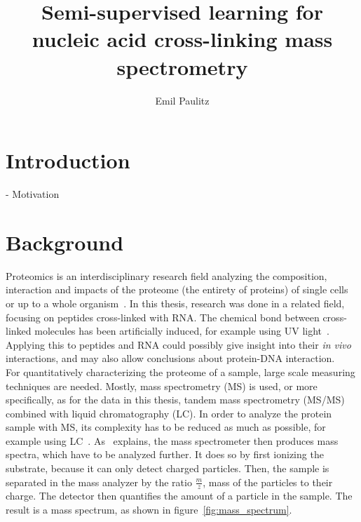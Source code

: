 \documentclass[10pt,a4paper]{article}
\author{Emil Paulitz}
\title{Semi-supervised learning for nucleic acid cross-linking mass spectrometry}
\begin{document}
	\ohead{\theauthor}
	\cfoot{\pagemark}
	\maketitle
	\tableofcontents
	
	\section{Introduction}
		- Motivation
	\section{Background}
		Proteomics is an interdisciplinary research field analyzing the composition, interaction and impacts of the proteome (the entirety of proteins) of single cells or up to a whole organism~\cite{Han2008, Sachsenberg2017}. In this thesis, research was done in a related field, focusing on peptides cross-linked with RNA. The chemical bond between cross-linked molecules has been artificially induced, for example using UV light~\cite{Sachsenberg2017}. Applying this to peptides and RNA could possibly give insight into their \textit{in vivo} interactions, and may also allow conclusions about protein-DNA interaction.\\
		For quantitatively characterizing the proteome of a sample, large scale measuring techniques are needed. Mostly, mass spectrometry (MS) is used, or more specifically, as for the data in this thesis, tandem mass spectrometry (MS/MS) combined with liquid chromatography (LC). In order to analyze the protein sample with MS, its complexity has to be reduced as much as possible, for example using LC~\cite{Sachsenberg2017}. As~\citet{Han2008} explains, the mass spectrometer then produces mass spectra, which have to be analyzed further. It does so by first ionizing the substrate, because it can only detect charged particles. Then, the sample is separated in the mass analyzer by the ratio $\frac{m}{z}$, mass of the particles to their charge. The detector then quantifies the amount of a particle in the sample. The result is a mass spectrum, as shown in figure~\ref{fig:mass_spectrum}.\\
\end{document}

